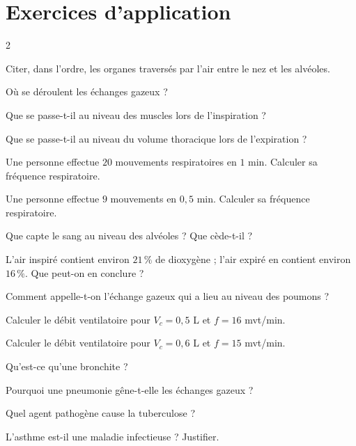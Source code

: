 \section{Exercices d'application}
\begin{multicols}{2}

\exo{} Citer, dans l'ordre, les organes traversés par l'air entre le nez et les
alvéoles.

\exo{} Où se déroulent les échanges gazeux ?

\exo{} Que se passe-t-il au niveau des muscles lors de l'inspiration ?

\exo{} Que se passe-t-il au niveau du volume thoracique lors de l'expiration ?

\exo{} Une personne effectue $20$ mouvements respiratoires en $1$ min. Calculer
sa fréquence respiratoire.

\exo{} Une personne effectue $9$ mouvements en $0{,}5$ min. Calculer sa fréquence
respiratoire.

\exo{} Que capte le sang au niveau des alvéoles ? Que cède-t-il ?

\exo{} L'air inspiré contient environ $21\,\%$ de dioxygène ; l'air expiré en
contient environ $16\,\%$. Que peut-on en conclure ?

\exo{} Comment appelle-t-on l'échange gazeux qui a lieu au niveau des poumons ?

\exo{} Calculer le débit ventilatoire pour $V_c=0{,}5$ L et $f=16$ mvt/min.

\exo{} Calculer le débit ventilatoire pour $V_c=0{,}6$ L et $f=15$ mvt/min.

\exo{} Qu'est-ce qu'une bronchite ?

\exo{} Pourquoi une pneumonie gêne-t-elle les échanges gazeux ?

\exo{} Quel agent pathogène cause la tuberculose ?

\exo{} L'asthme est-il une maladie infectieuse ? Justifier.

\end{multicols}

